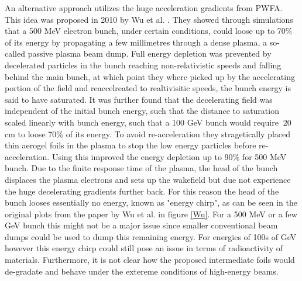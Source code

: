 An alternative approach utilizes the huge acceleration gradients from PWFA. This idea was proposed in 2010 by Wu et al. \cite{Wu2010}. They showed through simulations that a 500 MeV electron bunch, under certain conditions, could loose up to 70\% of its energy by propagating a few millimetres through a dense plasma, a so-called passive plasma beam dump. Full energy depletion was prevented by decelerated particles in the bunch reaching non-relativistic speeds and falling behind the main bunch, at which point they where picked up by the accelerating portion of the field and reaccelreated to realtivisitic speeds, the bunch energy is said to have saturated. It was further found that the decelerating field was independent of the initial bunch energy, such that the distance to saturation scaled linearly with bunch energy, such that a 100 GeV bunch would require $~20$ cm to loose 70\% of its energy. To avoid re-acceleration they stragetically placed thin aerogel foils in the plasma to stop the low energy particles before re-acceleration. Using this improved the energy depletion up to 90\% for 500 MeV bunch.  Due to the finite response time of the plasma, the head of the bunch displaces the plasma electrons and sets up the wakefield but due not experience the huge decelerating gradients further back. For this reason the head of the bunch looses essentially no energy, known as "energy chirp", as can be seen in the original plots from the paper by Wu et al.  in figure \ref{Wu}. For a 500 MeV or a few GeV bunch this might not be a major issue since smaller conventional beam dumps could be used to dump this remaining energy. For energies of 100s of GeV however this energy chirp could still pose an issue in terms of radioactivity of materials. Furthermore, it is not clear how the proposed intermediate foils would de-gradate and behave under the extereme conditions of high-energy beams.\\

